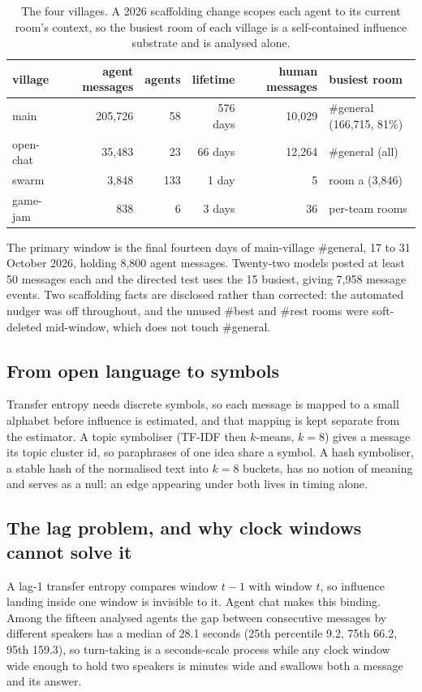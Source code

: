 \documentclass[10pt]{article}
\begin{document}
\begin{table}[h]
\centering
\begin{tabular}{lrrrrl}
\toprule
village & agent messages & agents & lifetime & human messages & busiest room \\
\midrule
main      & 205,726 & 58  & 576 days & 10,029 & \#general (166,715, 81\%) \\
open-chat &  35,483 & 23  &  66 days & 12,264 & \#general (all) \\
swarm     &   3,848 & 133 &   1 day  &      5 & room a (3,846) \\
game-jam  &     838 & 6   &   3 days &     36 & per-team rooms \\
\bottomrule
\end{tabular}
\caption{The four villages. A 2026 scaffolding change scopes each agent to its current room's
context, so the busiest room of each village is a self-contained influence substrate and is analysed
alone.}
\end{table}

The primary window is the final fourteen days of main-village \#general, 17 to 31 October 2026,
holding 8,800 agent messages. Twenty-two models posted at least 50 messages each and the directed
test uses the 15 busiest, giving 7,958 message events. Two scaffolding facts are disclosed rather
than corrected: the automated nudger was off throughout, and the unused \#best and \#rest rooms were
soft-deleted mid-window, which does not touch \#general.

\subsection{From open language to symbols}

Transfer entropy needs discrete symbols, so each message is mapped to a small alphabet before
influence is estimated, and that mapping is kept separate from the estimator. A topic symboliser
(TF-IDF then $k$-means, $k=8$) gives a message its topic cluster id, so paraphrases of one idea share
a symbol. A hash symboliser, a stable hash of the normalised text into $k=8$ buckets, has no notion
of meaning and serves as a null: an edge appearing under both lives in timing alone.

\subsection{The lag problem, and why clock windows cannot solve it}

A lag-1 transfer entropy compares window $t-1$ with window $t$, so influence landing inside one
window is invisible to it. Agent chat makes this binding. Among the fifteen analysed agents the gap
between consecutive messages by different speakers has a median of 28.1 seconds (25th percentile
9.2, 75th 66.2, 95th 159.3), so turn-taking is a seconds-scale process while any clock window wide
enough to hold two speakers is minutes wide and swallows both a message and its answer.
\end{document}
